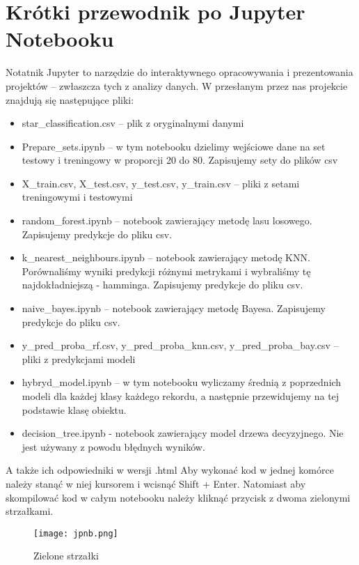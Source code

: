 \documentclass{article}
\begin{document}
\section{Krótki przewodnik po Jupyter Notebooku}
Notatnik Jupyter to narzędzie do interaktywnego opracowywania i prezentowania projektów -- zwłaszcza tych z analizy danych. \newline
W przesłanym przez nas projekcie znajdują się następujące pliki:
\begin{itemize}
    \item star\_classification.csv -- plik z oryginalnymi danymi
    \item Prepare\_sets.ipynb -- w tym notebooku dzielimy wejściowe dane na set testowy i treningowy w proporcji 20 do 80. Zapisujemy sety do plików csv
    \item X\_train.csv, X\_test.csv, y\_test.csv, y\_train.csv -- pliki z setami treningowymi i testowymi
    \item random\_forest.ipynb -- notebook zawierający metodę lasu losowego. Zapisujemy predykcje do pliku csv.
    \item k\_nearest\_neighbours.ipynb -- notebook zawierający metodę KNN. Porównaliśmy wyniki predykcji różnymi metrykami i wybraliśmy tę najdokładniejszą - hamminga.  Zapisujemy predykcje do pliku csv.
    \item naive\_bayes.ipynb -- notebook zawierający metodę Bayesa. Zapisujemy predykcje do pliku csv.
    \item y\_pred\_proba\_rf.csv, y\_pred\_proba\_knn.csv, y\_pred\_proba\_bay.csv -- pliki z predykcjami modeli
    \item hybryd\_model.ipynb -- w tym notebooku wyliczamy średnią z poprzednich modeli dla każdej klasy każdego rekordu, a następnie przewidujemy na tej podstawie klasę obiektu.
    \item decision\_tree.ipynb - notebook zawierający model drzewa decyzyjnego. Nie jest używany z powodu błędnych wyników.
\end{itemize}
A także ich odpowiedniki w wersji .html \newline
Aby wykonać kod w jednej komórce należy stanąć w niej kursorem i wcisnąć Shift + Enter. Natomiast aby skompilować kod w całym notebooku należy kliknąć przycisk z dwoma zielonymi strzałkami.
\begin{figure}[H]
    \centering
    \texttt{[image: jpnb.png]}
    \caption{Zielone strzałki}
    \label{fig:enter-label}
\end{figure}
\end{document}
